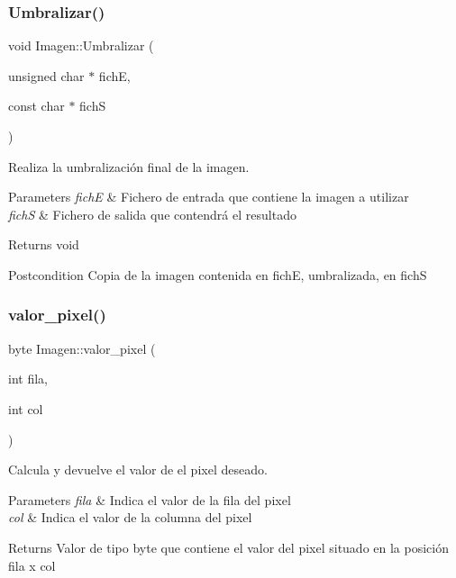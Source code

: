 \subsubsection{\texorpdfstring{Umbralizar()}{Umbralizar()}}
{\footnotesize\ttfamily void Imagen\+::\+Umbralizar (\begin{DoxyParamCaption}\item[{unsigned char $\ast$}]{fichE,  }\item[{const char $\ast$}]{fichS }\end{DoxyParamCaption})}



Realiza la umbralización final de la imagen. 


\begin{DoxyParams}{Parameters}
{\em fichE} & Fichero de entrada que contiene la imagen a utilizar \\
\hline
{\em fichS} & Fichero de salida que contendrá el resultado \\
\hline
\end{DoxyParams}
\begin{DoxyReturn}{Returns}
void 
\end{DoxyReturn}
\begin{DoxyPostcond}{Postcondition}
Copia de la imagen contenida en fichE, umbralizada, en fichS 
\end{DoxyPostcond}
\mbox{\label{classImagen_ae9488d0675cba4a9c7676aa738deeabe}} 
\subsubsection{\texorpdfstring{valor\+\_\+pixel()}{valor\_pixel()}\hspace{0.1cm}{\footnotesize\ttfamily [1/2]}}
{\footnotesize\ttfamily byte Imagen\+::valor\+\_\+pixel (\begin{DoxyParamCaption}\item[{int}]{fila,  }\item[{int}]{col }\end{DoxyParamCaption})}



Calcula y devuelve el valor de el pixel deseado. 


\begin{DoxyParams}{Parameters}
{\em fila} & Indica el valor de la fila del pixel \\
\hline
{\em col} & Indica el valor de la columna del pixel \\
\hline
\end{DoxyParams}
\begin{DoxyReturn}{Returns}
Valor de tipo byte que contiene el valor del pixel situado en la posición fila x col 
\end{DoxyReturn}
\mbox{\label{classImagen_a56724e20c166cb7f5c5300873cdd16ff}} 
